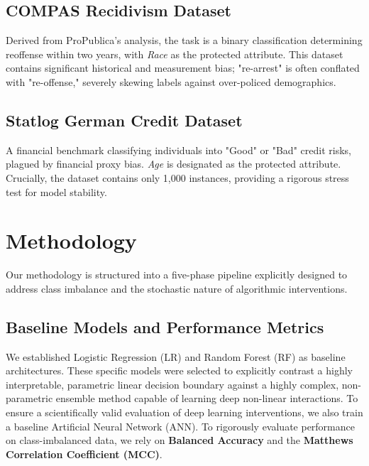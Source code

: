 \documentclass[conference]{IEEEtran}
\begin{document}
\subsection{COMPAS Recidivism Dataset}
Derived from ProPublica's analysis, the task is a binary classification determining reoffense within two years, with \textit{Race} as the protected attribute. This dataset contains significant historical and measurement bias; "re-arrest" is often conflated with "re-offense," severely skewing labels against over-policed demographics.

\subsection{Statlog German Credit Dataset}
A financial benchmark classifying individuals into "Good" or "Bad" credit risks, plagued by financial proxy bias. \textit{Age} is designated as the protected attribute. Crucially, the dataset contains only 1,000 instances, providing a rigorous stress test for model stability.

\section{Methodology}
Our methodology is structured into a five-phase pipeline explicitly designed to address class imbalance and the stochastic nature of algorithmic interventions.

\subsection{Baseline Models and Performance Metrics}
We established Logistic Regression (LR) and Random Forest (RF) as baseline architectures. These specific models were selected to explicitly contrast a highly interpretable, parametric linear decision boundary against a highly complex, non-parametric ensemble method capable of learning deep non-linear interactions. To ensure a scientifically valid evaluation of deep learning interventions, we also train a baseline Artificial Neural Network (ANN). To rigorously evaluate performance on class-imbalanced data, we rely on \textbf{Balanced Accuracy} and the \textbf{Matthews Correlation Coefficient (MCC)}.
\end{document}
